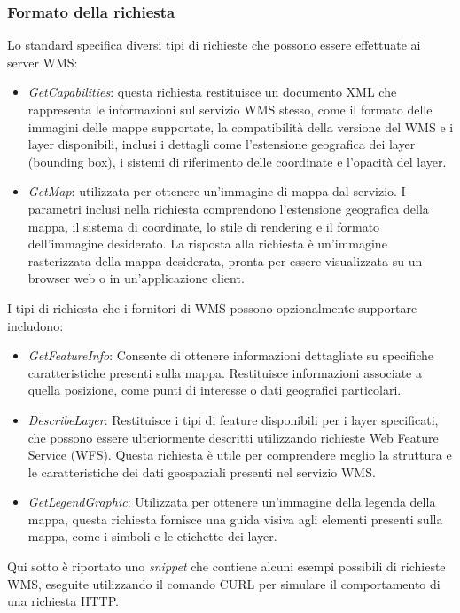 \subsubsection{Formato della richiesta}

Lo standard specifica diversi tipi di richieste che possono essere effettuate ai server WMS:
\begin{itemize}
      \item \textit{GetCapabilities}: questa richiesta restituisce un documento XML che rappresenta le informazioni sul servizio WMS stesso, come il formato delle immagini delle mappe supportate, la compatibilità della versione del WMS e i layer disponibili, inclusi i dettagli come l'estensione geografica dei layer (bounding box), i sistemi di riferimento delle coordinate e l'opacità del layer.
      \item \textit{GetMap}: utilizzata per ottenere un'immagine di mappa dal servizio. I parametri inclusi nella richiesta comprendono l'estensione geografica della mappa, il sistema di coordinate, lo stile di rendering e il formato dell'immagine desiderato. La risposta alla richiesta è un'immagine rasterizzata della mappa desiderata, pronta per essere visualizzata su un browser web o in un'applicazione client.
\end{itemize}
I tipi di richiesta che i fornitori di WMS possono opzionalmente supportare includono:
\begin{itemize}
      \item \textit{GetFeatureInfo}: Consente di ottenere informazioni dettagliate su specifiche caratteristiche presenti sulla mappa. Restituisce informazioni associate a quella posizione, come punti di interesse o dati geografici particolari.
      \item  \textit{DescribeLayer}: Restituisce i tipi di feature disponibili per i layer specificati, che possono essere ulteriormente descritti utilizzando richieste Web Feature Service (WFS). Questa richiesta è utile per comprendere meglio la struttura e le caratteristiche dei dati geospaziali presenti nel servizio WMS.
      \item \textit{GetLegendGraphic}: Utilizzata per ottenere un'immagine della legenda della mappa, questa richiesta fornisce una guida visiva agli elementi presenti sulla mappa, come i simboli e le etichette dei layer.
\end{itemize}
Qui sotto è riportato uno \textit{snippet} che contiene alcuni esempi possibili di richieste WMS, eseguite utilizzando il comando CURL per simulare il comportamento di una richiesta HTTP.
